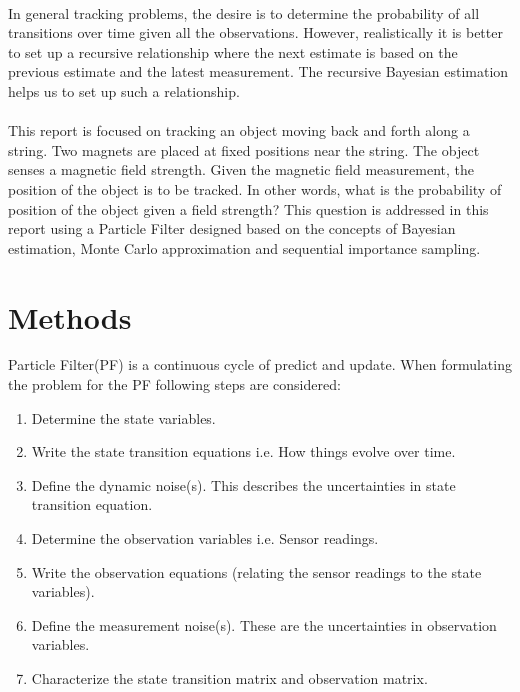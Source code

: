 \documentclass[12pt]{article}
\begin{document}
\\ \indent
In general tracking problems, the desire is to determine the probability of all transitions over time given all the observations. However, realistically it is better to set up a recursive relationship where the next estimate is based on the previous estimate and the latest measurement. The recursive Bayesian estimation helps us to set up such a relationship. \\ 
\\ \indent
This report is focused on tracking an object moving back and forth along a string. Two magnets are placed at fixed positions near the string. The object senses a magnetic field strength. Given the magnetic field measurement, the position of the object is to be tracked. In other words, what is the probability of position of the object given a field strength? This question is addressed in this report using a Particle Filter designed based on the concepts of Bayesian estimation, Monte Carlo approximation and sequential importance sampling.  

\section{Methods}
Particle Filter(PF) is a continuous cycle of predict and update. When formulating the problem for the PF following steps are considered:
\begin{enumerate}
	\item Determine the state variables.
	\item Write the state transition equations i.e. How things evolve over time.
	\item Define the dynamic noise(s).  This describes the uncertainties in state transition equation.
	\item Determine the observation variables i.e. Sensor readings.
	\item Write the observation equations (relating the sensor readings to the state variables).
	\item Define the measurement noise(s). These are the uncertainties in observation variables.
	\item Characterize the state transition matrix and observation matrix.
\end{enumerate}
\end{document}
